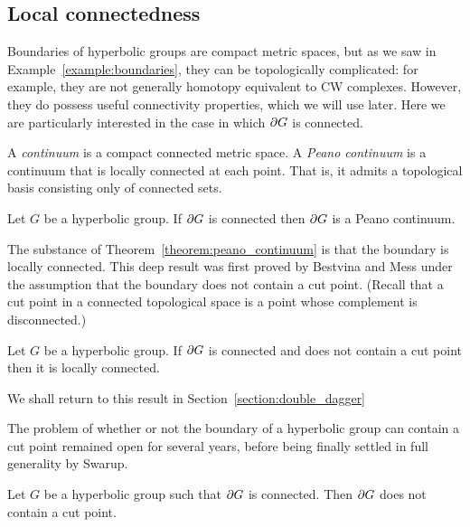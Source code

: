 \subsection{Local connectedness}\label{section:local_connectedness_of_gromov_boundary}

Boundaries of hyperbolic groups are compact metric spaces, but as we saw in Example~\ref{example:boundaries}, they can be topologically complicated: for example, they are not generally homotopy equivalent to CW complexes.
However, they do possess useful connectivity properties, which we will use later.
Here we are particularly interested in the case in which $\partial G$ is connected.

\begin{definition}
  A \emph{continuum} is a compact connected metric space.
  A \emph{Peano continuum} is a continuum that is locally connected at each point. That is, it admits a topological basis consisting only of connected sets.
\end{definition}

\begin{theorem}\label{theorem:peano_continuum}
  Let $G$ be a hyperbolic group.
  If $\partial G$ is connected then $\partial G$ is a Peano continuum.
\end{theorem}

The substance of Theorem~\ref{theorem:peano_continuum} is that the boundary is locally connected.
This deep result was first proved by Bestvina and Mess under the assumption that the boundary does not contain a cut point.
(Recall that a cut point in a connected topological space is a point whose complement is disconnected.)

\begin{proposition}\cite{bestvinamess91}
  Let $G$ be a hyperbolic group.
  If $\partial G$ is connected and does not contain a cut point then it is locally connected.
\end{proposition}

We shall return to this result in Section~\ref{section:double_dagger}

The problem of whether or not the boundary of a hyperbolic group can contain a cut point remained open for several years, before being finally settled in full generality by Swarup. 

\begin{theorem}\cite{swarup96}
  Let $G$ be a hyperbolic group such that $\partial G$ is connected. 
  Then $\partial G$ does not contain a cut point.
\end{theorem}

